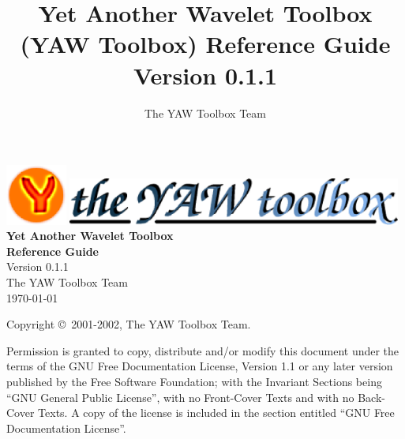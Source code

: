 \documentclass[12pt,a4paper]{article}
\begin{document}
\title{%
Yet Another Wavelet Toolbox (YAW Toolbox) Reference Guide\\ \medskip
  Version 0.1.1}
\author{%
  The YAW Toolbox Team}

\begin{titlepage}
\begin{center}
\includegraphics[width=2cm,keepaspectratio]{yawtb_cwtsph.eps}\quad
\includegraphics[width=11cm,keepaspectratio]{logo_bgwhite.eps}\\
\vspace{0.5cm}
{\LARGE\bf Yet Another Wavelet Toolbox\\[0.5cm]
Reference Guide}\\[1cm] 
Version 0.1.1\\[0.5cm]
The YAW Toolbox Team\\[0.5cm]
\today
\end{center}
\end{titlepage}

\begin{latexonly}
\begin{titlepage}
\clearpage
\vspace*{17cm}
\thispagestyle{empty}
Copyright \copyright\ 2001-2002,  The YAW Toolbox Team.

\medskip

Permission is granted to copy, distribute and/or modify this document under
the terms of the GNU Free Documentation License, Version 1.1 or any later
version published by the Free Software Foundation; with the Invariant
Sections being ``GNU General Public License'', with no Front-Cover Texts
and with no Back-Cover Texts. A copy of the license is included in the
section entitled ``GNU Free Documentation License''.


%
\end{titlepage}
\end{latexonly}
\end{document}

